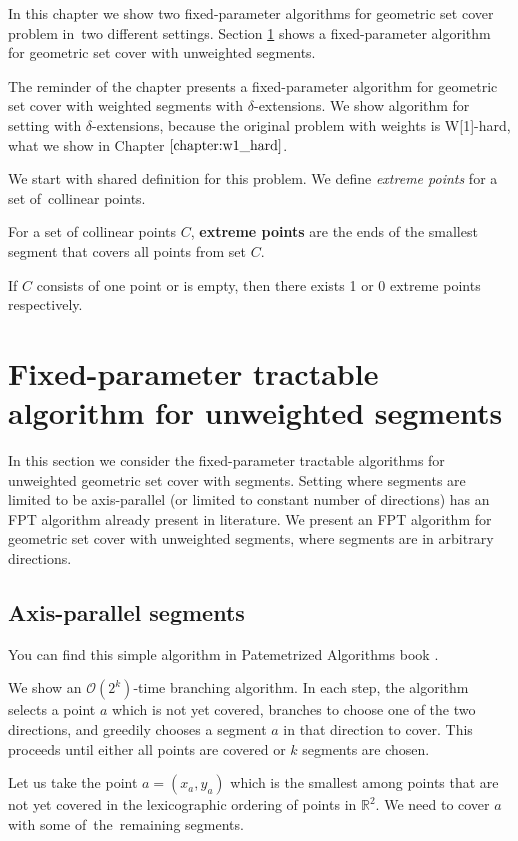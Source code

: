 In this chapter we show two fixed-parameter algorithms
for geometric set cover problem in~two different settings.
Section \ref{section:fpt_unweighted} shows 
a fixed-parameter algorithm for geometric set cover with unweighted segments.

The reminder of the chapter presents
a fixed-parameter algorithm for geometric set cover with weighted segments
with $\delta$-extensions. We show algorithm for setting with $\delta$-extensions,
because the original problem with weights is W[1]-hard,
what we show in Chapter $\ref{chapter:w1_hard}$.

We start with shared definition for this problem.
We define \textit{extreme points} for a set of~collinear points.

\begin{defi}
	For a set of collinear points $C$,
	\textbf{extreme points} are the ends
	of the smallest segment that covers all points from set $C$.
	
	If $C$ consists of one point or is empty, then
	there exists 1 or 0 extreme points respectively.
\end{defi}

\section{Fixed-parameter tractable algorithm for unweighted segments}
\label{section:fpt_unweighted}
In this section we consider the fixed-parameter tractable
algorithms for unweighted geometric set cover with segments.
Setting where segments are limited to be axis-parallel
(or limited to constant number of directions) has an FPT
algorithm already present in literature.
We present an FPT algorithm for geometric set cover
with unweighted segments, where segments are in arbitrary directions.

\subsection{Axis-parallel segments}
You can find this simple algorithm in Patemetrized Algorithms book \cite{platypus_book}.

We show an $\mathcal{O}(2^k)$-time branching algorithm.
In each step, the algorithm selects a point $a$ which is not yet covered,
branches to choose one of the two directions, and greedily chooses
a segment $a$ in that direction to cover.
This proceeds until either all points are covered or $k$ segments are chosen.

Let us take
the point $a=(x_a,y_a)$ which is the smallest 
among points that are not yet covered
in the lexicographic ordering
of points in $\mathbb{R}^2$.
We need to cover $a$ with some of~the~remaining segments.


